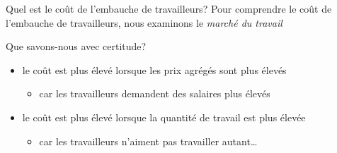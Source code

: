 \documentclass[
  ignorenonframetext,
  aspectratio=169,
]{beamer}
\providecommand{\tightlist}{%
  \setlength{\itemsep}{0pt}\setlength{\parskip}{0pt}}\usepackage{longtable,booktabs,array}
\begin{document}
\begin{frame}{Quel est le coût de l'embauche de travailleurs?}
\label{quel-est-le-couxfbt-de-lembauche-de-travailleurs}
Pour comprendre le coût de l'embauche de travailleurs, nous examinons le
\emph{marché du travail}

Que savons-nous avec certitude?

\begin{itemize}
\tightlist
\item
  le coût est plus élevé lorsque les prix agrégés sont plus élevés

  \begin{itemize}
  \tightlist
  \item
    car les travailleurs demandent des salaires plus élevés
  \end{itemize}
\item
  le coût est plus élevé lorsque la quantité de travail est plus élevée

  \begin{itemize}
  \tightlist
  \item
    car les travailleurs n'aiment pas travailler autant\ldots{}
  \end{itemize}
\end{itemize}
\end{frame}
\end{document}
